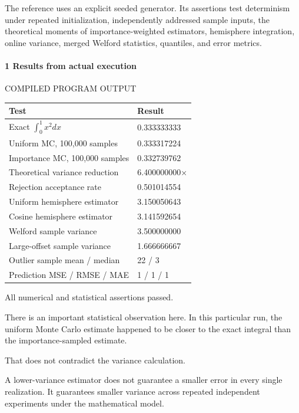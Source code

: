 The reference uses an explicit seeded generator. Its assertions test determinism under repeated initialization, independently addressed sample inputs, the theoretical moments of importance-weighted estimators, hemisphere integration, online variance, merged Welford statistics, quantiles, and error metrics.

\paragraph{1 Results from actual execution}\label{02-foundations-ii-ch039-results-from-actual-execution}

\hypertarget{02-foundations-ii-ch039-results-from-actual-execution}{}

COMPILED PROGRAM OUTPUT

{\def\LTcaptype{none} %
\begin{longtable}[]{@{}ll@{}}
\toprule\noalign{}
Test & Result \\
\midrule\noalign{}
\endhead
\bottomrule\noalign{}
\endlastfoot
Exact \(\int_0^1x^2dx\) & 0.333333333 \\
Uniform MC, 100,000 samples & 0.333317224 \\
Importance MC, 100,000 samples & 0.332739762 \\
Theoretical variance reduction & 6.400000000× \\
Rejection acceptance rate & 0.501014554 \\
Uniform hemisphere estimator & 3.150050643 \\
Cosine hemisphere estimator & 3.141592654 \\
Welford sample variance & 3.500000000 \\
Large-offset sample variance & 1.666666667 \\
Outlier sample mean / median & 22 / 3 \\
Prediction MSE / RMSE / MAE & 1 / 1 / 1 \\
\end{longtable}
}

All numerical and statistical assertions passed.

There is an important statistical observation here. In this particular run, the uniform Monte Carlo estimate happened to be closer to the exact integral than the importance-sampled estimate.

That does not contradict the variance calculation.

A lower-variance estimator does not guarantee a smaller error in every single realization. It guarantees smaller variance across repeated independent experiments under the mathematical model.

